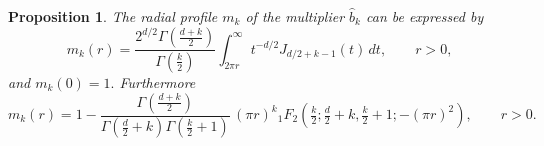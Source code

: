 \documentclass[10pt,a4paper]{amsart}
\newtheorem{proposition}{Proposition}
\begin{document}
\begin{proposition}
\label{pro: mk}
The radial profile $m_k$ of the multiplier $\widehat{b}_k$ can be expressed by 
 \begin{equation}
\label{eq: mk 1}
m_k(r)=\frac{2^{d/2} \Gamma(\frac{d + k}{2})}{\Gamma(\frac{k}{2})} \int_{2\pi r}^\infty t^{-d/2} J_{d/2 + k - 1}(t) \, dt,\qquad r>0,
\end{equation}
and $m_k(0)=1.$ Furthermore
\begin{equation}
\label{eq: mk 2}
 m_k(r) = 1 - \frac{\Gamma(\frac{d + k}{2})}{\Gamma(\frac{d}{2} + k) \Gamma(\frac{k}{2} + 1)} \, (\pi r)^k {_1F_2}(\tfrac{k}{2}; \tfrac{d}{2} + k, \tfrac{k}{2} + 1; -(\pi r)^2),\qquad r>0.
 \end{equation}
\end{proposition}
\end{document}
